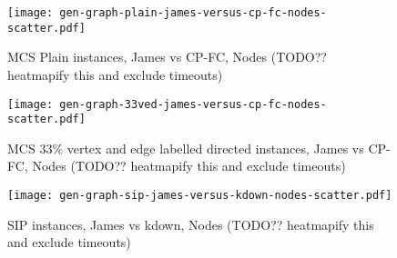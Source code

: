 \documentclass[letterpaper]{article}
\begin{document}
\begin{figure}
    \centering
    \texttt{[image: gen-graph-plain-james-versus-cp-fc-nodes-scatter.pdf]}
    \caption{MCS Plain instances, James vs CP-FC, Nodes (TODO?? heatmapify this
    and exclude timeouts)}\label{figure:plain-james-versus-cp-fc-nodes-scatter}
\end{figure}

\begin{figure}
    \centering
    \texttt{[image: gen-graph-33ved-james-versus-cp-fc-nodes-scatter.pdf]}
    \caption{MCS 33\% vertex and edge labelled directed instances, James vs
    CP-FC, Nodes (TODO?? heatmapify this and exclude
    timeouts)}\label{figure:33ved-james-versus-cp-fc-nodes-scatter}
\end{figure}

\begin{figure}
    \centering
    \texttt{[image: gen-graph-sip-james-versus-kdown-nodes-scatter.pdf]}
    \caption{SIP instances, James vs kdown, Nodes (TODO?? heatmapify this and exclude
    timeouts)}\label{figure:sip-james-versus-kdown-nodes-scatter}
\end{figure}



\end{document}
